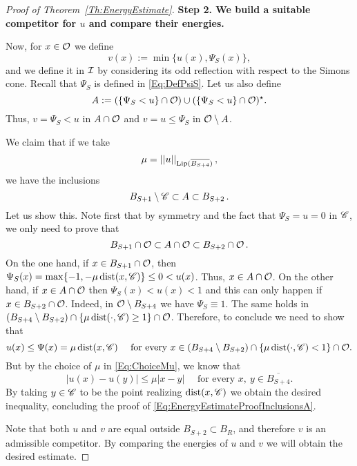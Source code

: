 \begin{proof}[Proof of Theorem~\ref{Th:EnergyEstimate}]
\textbf{Step 2. We build a suitable competitor for $u$ and compare their energies.}

Now, for $x\in \mathcal{O}$ we define
$$ 
v(x) := \min\{u(x),\Psi_S(x)\}, 
$$
and we define it in $\mathcal{I}$ by considering its odd reflection with respect to the Simons cone. Recall that $\Psi_S$ is defined in \eqref{Eq:DefPsiS}. Let us also define
$$
A :=(\{\Psi_S < u\}\cap \mathcal{O}) \cup (\{\Psi_S < u\}\cap \mathcal{O})^\star. 
$$
Thus, $v = \Psi_S < u$ in $A\cap \mathcal{O}$ and $v=u\leq\Psi_S$ in $\mathcal{O} \setminus A$. 

We claim that if we take
\begin{equation}
	\label{Eq:ChoiceMu}
	\mu = \left | \left |{u} \right | \right |_{\mathrm{Lip}(\overline{B_{S+4}})},
\end{equation}
we have the inclusions
\begin{equation}
\label{Eq:EnergyEstimateProofInclusionsA}
	B_{S+1}\setminus \mathscr{C} \subset A \subset B_{S+2}\,.
\end{equation}
Let us show this. Note first that by symmetry and the fact that $\Psi_S = u =0$ in $\mathscr{C}$, we only need to prove that 
$$
	B_{S+1} \cap \mathcal{O}\subset A \cap \mathcal{O}\subset B_{S+2}\cap \mathcal{O}\,.
$$
On the one hand, if $ x\in B_{S+1}\cap \mathcal{O}$, then $\Psi_S(x) = \max\{-1,-\mu\operatorname{dist}(x,\mathscr{C})\} \leq 0 < u(x)$. Thus, $x\in A\cap \mathcal{O}$. On the other hand, if $ x\in A\cap \mathcal{O}$ then $\Psi_S(x) < u(x) < 1$ and this can only happen if $x\in B_{S+2}\cap \mathcal{O}$. Indeed, in $\mathcal{O}\setminus B_{S+4}$ we have $\Psi_S \equiv 1$. The same holds in $(B_{S+4}\setminus B_{S+2})\cap \{\mu \operatorname{dist}(\cdot, \mathscr{C})\geq 1\} \cap \mathcal{O}$. Therefore, to conclude we need to show that 
$$
u(x) \leq \Psi(x) = \mu \operatorname{dist} (x,\mathscr{C}) \quad \text{ for every } x \in (B_{S+4}\setminus B_{S+2})\cap \{\mu \operatorname{dist}(\cdot, \mathscr{C})< 1\} \cap \mathcal{O}.
$$
But by the choice of $\mu$ in \eqref{Eq:ChoiceMu}, we know that
$$
|u(x) - u(y)|\leq \mu |x-y| \quad \text{ for every } x, \ y \in \overline{B_{S+4}}.
$$
By taking $y\in \mathscr{C}$ to be the point realizing $\operatorname{dist}(x,\mathscr{C})$ we obtain the desired inequality, concluding the proof of \eqref{Eq:EnergyEstimateProofInclusionsA}.

Note that both $u$ and $v$ are equal outside $B_{S+2} \subset B_R$, and therefore $v$ is an admissible competitor. By comparing the energies of $u$ and $v$ we will obtain the desired estimate. 


\end{proof}
